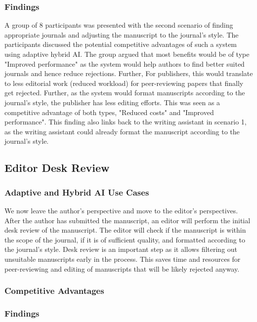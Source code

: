 \subsubsection*{Findings}

A group of 8 participants was presented with the second scenario of finding appropriate journals and adjusting the manuscript to the
journal's style. The participants discussed the potential competitive advantages of such a system using adaptive hybrid AI. The group 
argued that most benefits would be of type "Improved performance" as the system would help authors to find better suited journals and
hence reduce rejections. Further, For publishers, this would translate to less editorial work (reduced workload) for peer-reviewing
papers that finally get rejected. Further, as the system would format manuscripts according to the journal's style, the publisher has
less editing efforts. This was seen as a competitive advantage of both types, "Reduced costs" and "Improved performance". This 
finding also links back to the writing assistant in scenario 1, as the writing assistant could already format the manuscript according
to the journal's style.

\subsection{Editor Desk Review}

\subsubsection*{Adaptive and Hybrid AI Use Cases}

We now leave the author's perspective and move to the editor's perspectives. After the author has submitted the manuscript, an editor
will perform the initial desk review of the manuscript. The editor will check if the manuscript is within the scope of the journal, if
it is of sufficient quality, and formatted according to the journal's style. Desk review is an important step as it allows filtering out
unsuitable manuscripts early in the process. This saves time and resources for peer-reviewing and editing of manuscripts that will be
likely rejected anyway.

\subsubsection*{Competitive Advantages} 
\subsubsection*{Findings}


